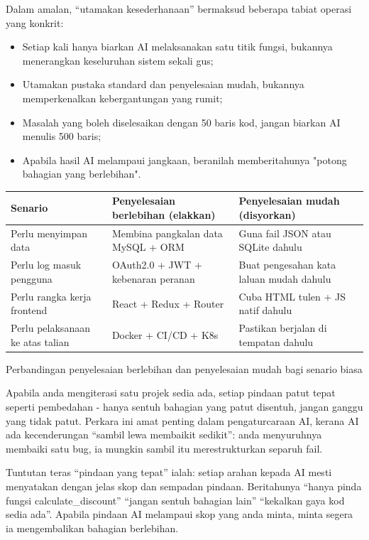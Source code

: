 Dalam amalan, “utamakan kesederhanaan” bermaksud beberapa tabiat operasi yang konkrit:

\begin{itemize}
  \item Setiap kali hanya biarkan AI melaksanakan satu titik fungsi, bukannya menerangkan keseluruhan sistem sekali gus;
  \item Utamakan pustaka standard dan penyelesaian mudah, bukannya memperkenalkan kebergantungan yang rumit;
  \item Masalah yang boleh diselesaikan dengan 50 baris kod, jangan biarkan AI menulis 500 baris;
  \item Apabila hasil AI melampaui jangkaan, beranilah memberitahunya "potong bahagian yang berlebihan".
\end{itemize}

\begin{center}
\begin{tabularx}{\linewidth}{|X|X|X|}
\hline
\textbf{Senario} & \textbf{Penyelesaian berlebihan (elakkan)} & \textbf{Penyelesaian mudah (disyorkan)} \tabularnewline
\hline
Perlu menyimpan data & Membina pangkalan data MySQL + ORM & Guna fail JSON atau SQLite dahulu \tabularnewline
Perlu log masuk pengguna & OAuth2.0 + JWT + kebenaran peranan & Buat pengesahan kata laluan mudah dahulu \tabularnewline
Perlu rangka kerja frontend & React + Redux + Router & Cuba HTML tulen + JS natif dahulu \tabularnewline
Perlu pelaksanaan ke atas talian & Docker + CI/CD + K8s & Pastikan berjalan di tempatan dahulu \tabularnewline
\hline
\end{tabularx}
\end{center}

\begin{center}\small\color{gray}Perbandingan penyelesaian berlebihan dan penyelesaian mudah bagi senario biasa\end{center}


Apabila anda mengiterasi satu projek sedia ada, setiap pindaan patut tepat seperti pembedahan - hanya sentuh bahagian yang patut disentuh, jangan ganggu yang tidak patut. Perkara ini amat penting dalam pengaturcaraan AI, kerana AI ada kecenderungan “sambil lewa membaikit sedikit”: anda menyuruhnya membaiki satu bug, ia mungkin sambil itu merestrukturkan separuh fail.

Tuntutan teras “pindaan yang tepat” ialah: setiap arahan kepada AI mesti menyatakan dengan jelas skop dan sempadan pindaan. Beritahunya “hanya pinda fungsi calculate\_discount” “jangan sentuh bahagian lain” “kekalkan gaya kod sedia ada”. Apabila pindaan AI melampaui skop yang anda minta, minta segera ia mengembalikan bahagian berlebihan.

